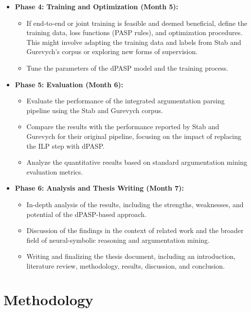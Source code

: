 \documentclass{article}
\begin{document}
\begin{itemize}
    \item \textbf{Phase 4: Training and Optimization (Month 5):}
    \begin{itemize}
        \item If end-to-end or joint training is feasible and deemed beneficial,
        define the training data, loss functions (PASP rules), and optimization
        procedures.
        This might involve adapting the training data and labels from Stab and
        Gurevych's corpus or exploring new forms of supervision.
        \item Tune the parameters of the dPASP model and the training process.
    \end{itemize}

    \item \textbf{Phase 5: Evaluation (Month 6):}
    \begin{itemize}
        \item Evaluate the performance of the integrated argumentation parsing
        pipeline using the Stab and Gurevych corpus.
        \item Compare the results with the performance reported by Stab and
        Gurevych for their original pipeline, focusing on the impact of
        replacing the ILP step with dPASP.
        \item Analyze the quantitative results based on standard argumentation
        mining evaluation metrics.
    \end{itemize}

    \item \textbf{Phase 6: Analysis and Thesis Writing (Month 7):}
    \begin{itemize}
        \item In-depth analysis of the results, including the strengths,
        weaknesses, and potential of the dPASP-based approach.
        \item Discussion of the findings in the context of related work and the
        broader field of neural-symbolic reasoning and argumentation mining.
        \item Writing and finalizing the thesis document,
        including an introduction, literature review, methodology, results,
        discussion, and conclusion.
    \end{itemize}
\end{itemize}

\section{Methodology}
\end{document}
